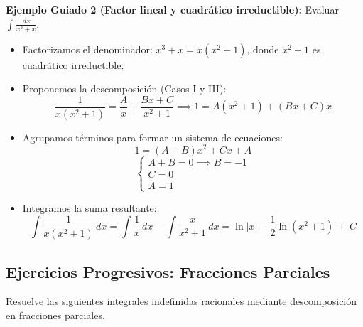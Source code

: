 \documentclass[12pt, letterpaper]{article}
\newcommand{\dx}{\,dx}
\newcommand{\CC}{\,+\,C}
\begin{document}
\vspace{4pt}
\noindent\textbf{Ejemplo Guiado 2 (Factor lineal y cuadrático irreductible):} Evaluar $\int \frac{\dx}{x^3+x}$.
\begin{itemize}
  \item Factorizamos el denominador: $x^3+x = x(x^2+1)$, donde $x^2+1$ es cuadrático irreductible.
  \item Proponemos la descomposición (Casos I y III):
    $$\frac{1}{x(x^2+1)} = \frac{A}{x} + \frac{Bx+C}{x^2+1} \implies 1 = A(x^2+1) + (Bx+C)x$$
  \item Agrupamos términos para formar un sistema de ecuaciones:
    $$1 = (A+B)x^2 + Cx + A$$
    $$\begin{cases} A + B = 0 \implies B = -1 \\ C = 0 \\ A = 1 \end{cases}$$
  \item Integramos la suma resultante:
    $$\int \frac{1}{x(x^2+1)} \dx = \int \frac{1}{x} \dx - \int \frac{x}{x^2+1} \dx = \ln|x| - \frac{1}{2}\ln(x^2+1) \CC$$
\end{itemize}

\newpage

\subsection{Ejercicios Progresivos: Fracciones Parciales}
Resuelve las siguientes integrales indefinidas racionales mediante descomposición en fracciones parciales.
\end{document}
